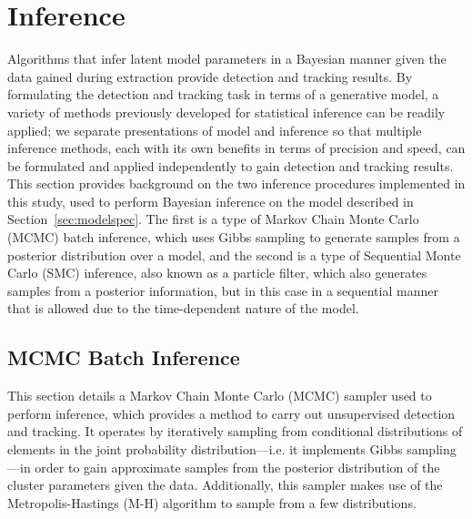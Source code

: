 \documentclass[smallcondensed, final]{svjour3}
\begin{document}
\section{Inference}
\label{sec:inference}
Algorithms that infer latent model parameters in a Bayesian manner given the data gained during extraction provide detection and tracking results. By formulating the detection and tracking task in terms of a generative model, a variety of methods previously developed for statistical inference can be readily applied; we separate presentations of model and inference so that multiple inference methods, each with its own benefits in terms of precision and speed, can be formulated and applied independently to gain detection and tracking results. This section provides background on the two inference procedures implemented in this study, used to perform Bayesian inference on the model described in Section~\ref{sec:modelspec}. The first is a type of Markov Chain Monte Carlo (MCMC) batch inference, which uses Gibbs sampling to generate samples from a posterior distribution over a model, and the second is a type of Sequential Monte Carlo (SMC) inference, also known as a particle filter, which also generates samples from a posterior information, but in this case in a sequential manner that is allowed due to the time-dependent nature of the model.


\subsection{MCMC Batch Inference}
\label{sec:MCMC}

This section details a Markov Chain Monte Carlo (MCMC) sampler used to perform inference, which provides a method to carry out unsupervised detection and tracking. It operates by iteratively sampling from conditional distributions of elements in the joint probability distribution---i.e. it implements Gibbs sampling---in order to gain approximate samples from the posterior distribution of the cluster parameters given the data. Additionally, this sampler makes use of the Metropolis-Hastings (M-H) algorithm to sample from a few distributions.
\end{document}
